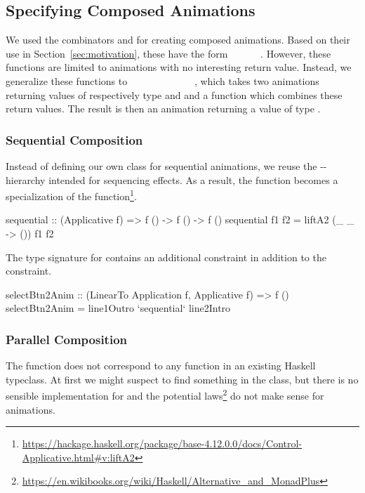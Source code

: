 \subsection{Specifying Composed Animations}

We used the combinators  and  for creating composed animations. Based on their use in Section~\ref{sec:motivation}, these have the form ~\hs{()}~\hs{->}~~\hs{->}~~\hs{()}. However, these functions are limited to animations with no interesting return value. Instead, we generalize these functions to \hs{(}~\hs{->}~~\hs{->}~\hs{)}~\hs{->}~~~\hs{->}~~~\hs{->}~~, which takes two animations returning values of respectively type  and  and a function which combines these return values. The result is then an animation returning a value of type .

\subsubsection{Sequential Composition}

Instead of defining our own class for sequential animations, we reuse the -- hierarchy intended for sequencing effects. As a result, the  function becomes a specialization of the  function\footnote{\url{https://hackage.haskell.org/package/base-4.12.0.0/docs/Control-Applicative.html\#v:liftA2}}.

\begin{code}
sequential :: (Applicative f) => f () -> f () -> f ()
sequential f1 f2 = liftA2 (\_ _ -> ()) f1 f2
\end{code}

The type signature for  contains an additional  constraint in addition to the  constraint.

\begin{code}
selectBtn2Anim :: (LinearTo Application f, Applicative f) => f ()
selectBtn2Anim = line1Outro `sequential` line2Intro
\end{code}

\subsubsection{Parallel Composition}

The  function does not correspond to any function in an existing Haskell typeclass. At first we might suspect to find something in the  class, but there is no sensible implementation for  and the potential laws\footnote{\url{https://en.wikibooks.org/wiki/Haskell/Alternative_and_MonadPlus}} do not make sense for animations.

